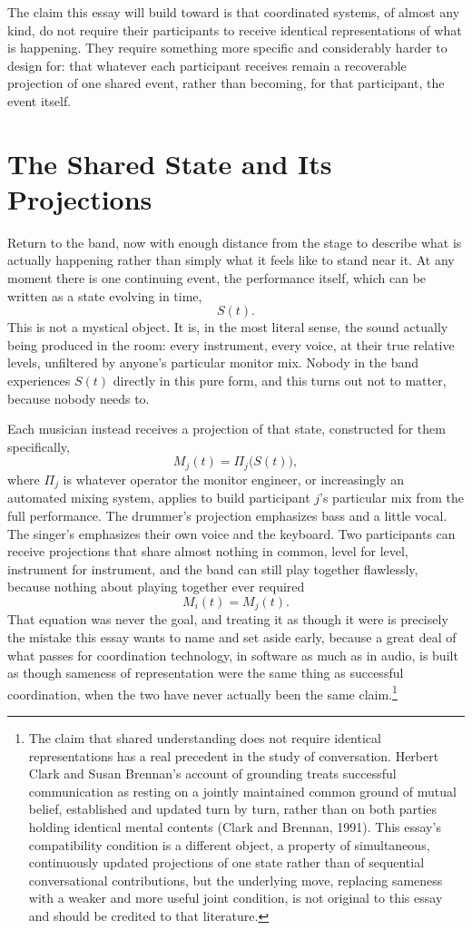 \documentclass[12pt]{article}
\begin{document}
The claim this essay will build toward is that coordinated systems, of almost any kind, do not require their participants to receive identical representations of what is happening. They require something more specific and considerably harder to design for: that whatever each participant receives remain a recoverable projection of one shared event, rather than becoming, for that participant, the event itself.

\section{The Shared State and Its Projections}

Return to the band, now with enough distance from the stage to describe what is actually happening rather than simply what it feels like to stand near it. At any moment there is one continuing event, the performance itself, which can be written as a state evolving in time,
\[
S(t).
\]
This is not a mystical object. It is, in the most literal sense, the sound actually being produced in the room: every instrument, every voice, at their true relative levels, unfiltered by anyone's particular monitor mix. Nobody in the band experiences $S(t)$ directly in this pure form, and this turns out not to matter, because nobody needs to.

Each musician instead receives a projection of that state, constructed for them specifically,
\[
M_j(t) = \Pi_j\bigl(S(t)\bigr),
\]
where $\Pi_j$ is whatever operator the monitor engineer, or increasingly an automated mixing system, applies to build participant $j$'s particular mix from the full performance. The drummer's projection emphasizes bass and a little vocal. The singer's emphasizes their own voice and the keyboard. Two participants can receive projections that share almost nothing in common, level for level, instrument for instrument, and the band can still play together flawlessly, because nothing about playing together ever required
\[
M_i(t) = M_j(t).
\]
That equation was never the goal, and treating it as though it were is precisely the mistake this essay wants to name and set aside early, because a great deal of what passes for coordination technology, in software as much as in audio, is built as though sameness of representation were the same thing as successful coordination, when the two have never actually been the same claim.\footnote{The claim that shared understanding does not require identical representations has a real precedent in the study of conversation. Herbert Clark and Susan Brennan's account of grounding treats successful communication as resting on a jointly maintained common ground of mutual belief, established and updated turn by turn, rather than on both parties holding identical mental contents (Clark and Brennan, 1991). This essay's compatibility condition is a different object, a property of simultaneous, continuously updated projections of one state rather than of sequential conversational contributions, but the underlying move, replacing sameness with a weaker and more useful joint condition, is not original to this essay and should be credited to that literature.}
\end{document}

